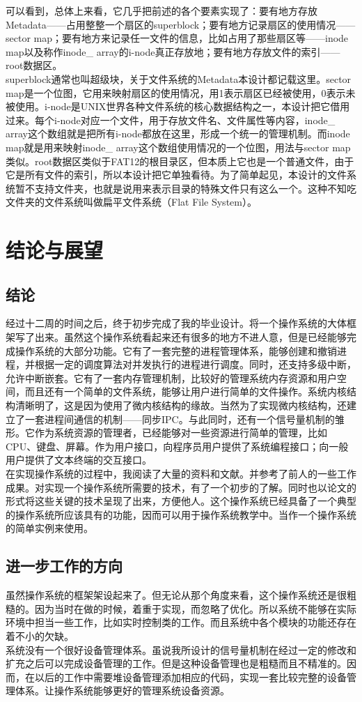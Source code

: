 \documentclass[UTF8,nofonts,cs4size]{ctexrep}
\begin{document}
可以看到，总体上来看，它几乎把前述的各个要素实现了：要有地方存放Metadata——占用整整一个扇区的superblock；要有地方记录扇区的使用情况——sector map；要有地方来记录任一文件的信息，比如占用了那些扇区等——inode map以及称作inode\_ array的i-node真正存放地；要有地方存放文件的索引——root数据区。
\\
\indent 
superblock通常也叫超级块，关于文件系统的Metadata本设计都记载这里。sector map是一个位图，它用来映射扇区的使用情况，用1表示扇区已经被使用，0表示未被使用。i-node是UNIX世界各种文件系统的核心数据结构之一，本设计把它借用过来。每个i-node对应一个文件，用于存放文件名、文件属性等内容，inode\_ array这个数组就是把所有i-node都放在这里，形成一个统一的管理机制。而inode map就是用来映射inode\_ array这个数组使用情况的一个位图，用法与sector map类似。root数据区类似于FAT12的根目录区，但本质上它也是一个普通文件，由于它是所有文件的索引，所以本设计把它单独看待。为了简单起见，本设计的文件系统暂不支持文件夹，也就是说用来表示目录的特殊文件只有这么一个。这种不知吃文件夹的文件系统叫做扁平文件系统（Flat File System）。
\chapter{结论与展望}
\section{结论}
经过十二周的时间之后，终于初步完成了我的毕业设计。将一个操作系统的大体框架写了出来。虽然这个操作系统看起来还有很多的地方不进人意，但是已经能够完成操作系统的大部分功能。它有了一套完整的进程管理体系，能够创建和撤销进程，并根据一定的调度算法对并发执行的进程进行调度。同时，还支持多级中断，允许中断嵌套。它有了一套内存管理机制，比较好的管理系统内存资源和用户空间，而且还有一个简单的文件系统，能够让用户进行简单的文件操作。系统内核结构清晰明了，这是因为使用了微内核结构的缘故。当然为了实现微内核结构，还建立了一套进程间通信的机制——同步IPC。与此同时，还有一个信号量机制的雏形。它作为系统资源的管理者，已经能够对一些资源进行简单的管理，比如CPU、键盘、屏幕。作为用户接口，向程序员用户提供了系统编程接口；向一般用户提供了文本终端的交互接口。
\\
\indent
在实现操作系统的过程中，我阅读了大量的资料和文献。并参考了前人的一些工作成果。对实现一个操作系统所需要的技术，有了一个初步的了解。同时也以论文的形式将这些关键的技术呈现了出来，方便他人。这个操作系统已经具备了一个典型的操作系统所应该具有的功能，因而可以用于操作系统教学中。当作一个操作系统的简单实例来使用。
\section{进一步工作的方向}
虽然操作系统的框架架设起来了。但无论从那个角度来看，这个操作系统还是很粗糙的。因为当时在做的时候，着重于实现，而忽略了优化。所以系统不能够在实际环境中担当一些工作，比如实时控制类的工作。而且系统中各个模块的功能还存在着不小的欠缺。
\\ \indent 
系统没有一个很好设备管理体系。虽说我所设计的信号量机制在经过一定的修改和扩充之后可以完成设备管理的工作。但是这种设备管理也是粗糙而且不精准的。因而，在以后的工作中需要堆设备管理添加相应的代码，实现一套比较完整的设备管理体系。让操作系统能够更好的管理系统设备资源。
\end{document}
